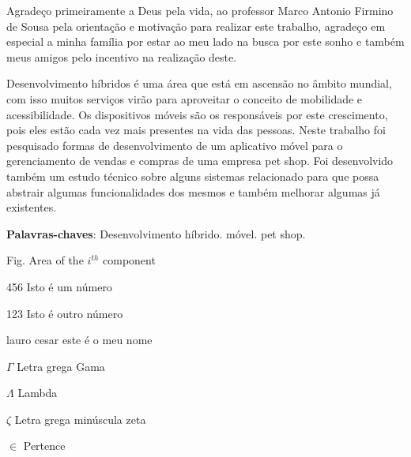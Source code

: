 \documentclass[12pt,openright,twoside,a4paper,english,french,spanish,brazil]{abntex2}
\begin{document}
\begin{agradecimentos}
Agradeço primeiramente a Deus pela vida, ao professor Marco Antonio Firmino de Sousa pela orientação e motivação para realizar este trabalho, agradeço em especial a minha família por estar ao meu lado na busca por este sonho e também meus amigos pelo incentivo na realização deste.

\end{agradecimentos}


\begin{resumo}
 Desenvolvimento híbridos é uma área que está em ascensão no âmbito mundial, com isso muitos serviços virão para aproveitar o conceito de mobilidade e acessibilidade. Os dispositivos móveis são os responsáveis por este crescimento, pois eles estão cada vez mais presentes na vida das pessoas. Neste trabalho foi pesquisado formas de desenvolvimento de um aplicativo móvel para o gerenciamento de vendas e compras de uma empresa pet shop. Foi desenvolvido também um estudo técnico sobre alguns sistemas relacionado para que possa abstrair algumas funcionalidades dos mesmos e também melhorar algumas já existentes.

 \vspace{\onelineskip}
    
 \noindent
 \textbf{Palavras-chaves}: Desenvolvimento híbrido. móvel. pet shop.
\end{resumo}

\listoffigures*
\cleardoublepage

\listoftables*
\cleardoublepage

\begin{siglas}
  \item[Fig.] Area of the $i^{th}$ component
  \item[456] Isto é um número
  \item[123] Isto é outro número
  \item[lauro cesar] este é o meu nome
\end{siglas}

\begin{simbolos}
  \item[$ \Gamma $] Letra grega Gama
  \item[$ \Lambda $] Lambda
  \item[$ \zeta $] Letra grega minúscula zeta
  \item[$ \in $] Pertence
\end{simbolos}
\end{document}
